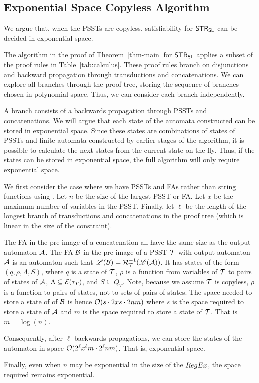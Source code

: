
\subsection{Exponential Space Copyless Algorithm}
\label{sec:appendix}

We argue that, when the PSSTs are copyless, satisfiability for $\mathsf{STR}_{\mathsf{SL}}$ can be decided in exponential space.

The algorithm in the proof of Theorem~\ref{thm-main} for $\mathsf{STR}_{\mathsf{SL}}$ applies a subset of the proof rules in Table~\ref{tab:calculus}. These proof rules branch on disjunctions and backward propagation through transductions and concatenations. We can explore all branches through the proof tree, storing the sequence of branches chosen in polynomial space. Thus, we can consider each branch independently.

A branch consists of a backwards propagation through PSSTs and concatenations. We will argue that each state of the automata constructed can be stored in exponential space.
Since these states are combinations of states of PSSTs and finite automata constructed by earlier stages of the algorithm, it is possible to calculate the next states from the current state on the fly.
Thus, if the states can be stored in exponential space, the full algorithm will only require exponential space.

We first consider the case where we have PSSTs and FAs rather than string functions using \regexp{}.
Let $n$ be the size of the largest PSST or FA.
Let $x$ be the maximum number of variables in the PSST.
Finally, let $\ell$ be the length of the longest branch of transductions and concatenations in the proof tree (which is linear in the size of the constraint).

The FA in the pre-image of a concatenation all have the same size as the output automaton $\mathcal{A}$.
The FA $\mathcal{B}$ in the pre-image of a PSST $\mathcal{T}$ with output automaton $\mathcal{A}$ is an automaton such that
$\mathscr{L}(\mathcal{B}) = \mathcal{R}^{-1}_{\mathcal{T}}(\mathscr{L}(\mathcal{A}))$.
It has states of the form
$(q, \rho, \Lambda, S)$,
where
    $q$ is a state of $\mathcal{T}$,
    $\rho$ is a function from variables of $\mathcal{T}$ to pairs of states of $\mathcal{A}$,
    $\Lambda \subseteq \mathcal{E}(\tau_T)$, and
    $S \subseteq Q_T$.
Note, because we assume $\mathcal{T}$ is copyless, $\rho$ is a function to pairs of states, not to sets of pairs of states.
The space needed to store a state of of $\mathcal{B}$ is hence
$\mathcal{O}(s \cdot 2 x s \cdot 2 n m)$
where $s$ is the space required to store a state of $\mathcal{A}$ and $m$ is the space required to store a state of $\mathcal{T}$.
That is $m = \log(n)$.

Consequently, after $\ell$ backwards propagations, we can store the states of the automaton in space
$\mathcal{O}(2^\ell x^\ell m \cdot 2^\ell n m)$.
That is, exponential space.

Finally, even when $n$ may be exponential in the size of the ${RegEx}$, the space required remains exponential.




